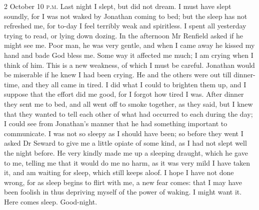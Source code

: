 \begin{diary}{2 October 10 \textsc{p.m.}}
Last night I slept, but did not dream. I must have slept soundly, for I was not waked by Jonathan coming to bed; but the sleep has not refreshed me, for to-day I feel terribly weak and spiritless. I spent all yesterday trying to read, or lying down dozing. In the afternoon Mr Renfield asked if he might see me. Poor man, he was very gentle, and when I came away he kissed my hand and bade God bless me. Some way it affected me much; I am crying when I think of him. This is a new weakness, of which I must be careful. Jonathan would be miserable if he knew I had been crying. He and the others were out till dinner-time, and they all came in tired. I did what I could to brighten them up, and I suppose that the effort did me good, for I forgot how tired I was. After dinner they sent me to bed, and all went off to smoke together, as they said, but I knew that they wanted to tell each other of what had occurred to each during the day; I could see from Jonathan's manner that he had something important to communicate. I was not so sleepy as I should have been; so before they went I asked Dr Seward to give me a little opiate of some kind, as I had not slept well the night before. He very kindly made me up a sleeping draught, which he gave to me, telling me that it would do me no harm, as it was very mild I have taken it, and am waiting for sleep, which still keeps aloof. I hope I have not done wrong, for as sleep begins to flirt with me, a new fear comes: that I may have been foolish in thus depriving myself of the power of waking. I might want it. Here comes sleep. Good-night.
	\end{diary}